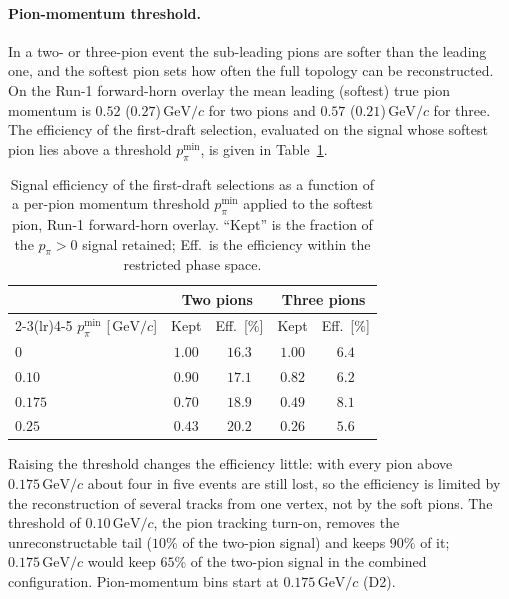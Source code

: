 \documentclass[11pt,a4paper]{article}
\newcommand{\GeVc}{\,\text{GeV}\!/c}
\begin{document}
\paragraph{Pion-momentum threshold.} In a two- or three-pion event the sub-leading pions are softer
than the leading one, and the softest pion sets how often the full topology can be reconstructed. On
the Run-1 forward-horn overlay the mean leading (softest) true pion momentum is $0.52$ ($0.27$)$\GeVc$
for two pions and $0.57$ ($0.21$)$\GeVc$ for three. The efficiency of the first-draft selection,
evaluated on the signal whose softest pion lies above a threshold $p_\pi^{\min}$, is given in
Table~\ref{tab:mp_thr}.

\begin{table}[H]
  \centering
  \caption{Signal efficiency of the first-draft selections as a function of a per-pion momentum
    threshold $p_\pi^{\min}$ applied to the softest pion, Run-1 forward-horn overlay. ``Kept'' is the
    fraction of the $p_\pi>0$ signal retained; Eff.\ is the efficiency within the restricted phase
    space.}
  \label{tab:mp_thr}
  \small
  \begin{tabular}{lcccc}
    \toprule
    & \multicolumn{2}{c}{Two pions} & \multicolumn{2}{c}{Three pions} \\
    \cmidrule(lr){2-3}\cmidrule(lr){4-5}
    $p_\pi^{\min}$ [$\GeVc$] & Kept & Eff.\ [\%] & Kept & Eff.\ [\%] \\
    \midrule
    $0$       & $1.00$ & $16.3$ & $1.00$ & $6.4$ \\
    $0.10$    & $0.90$ & $17.1$ & $0.82$ & $6.2$ \\
    $0.175$   & $0.70$ & $18.9$ & $0.49$ & $8.1$ \\
    $0.25$    & $0.43$ & $20.2$ & $0.26$ & $5.6$ \\
    \bottomrule
  \end{tabular}
\end{table}

Raising the threshold changes the efficiency little: with every pion above $0.175\GeVc$ about four in
five events are still lost, so the efficiency is limited by the reconstruction of several tracks from
one vertex, not by the soft pions. The threshold of $0.10\GeVc$, the pion tracking turn-on, removes the
unreconstructable tail ($10\%$ of the two-pion signal) and keeps $90\%$ of it; $0.175\GeVc$ would keep
$65\%$ of the two-pion signal in the combined configuration. Pion-momentum bins start at $0.175\GeVc$
(D2).

\end{document}

